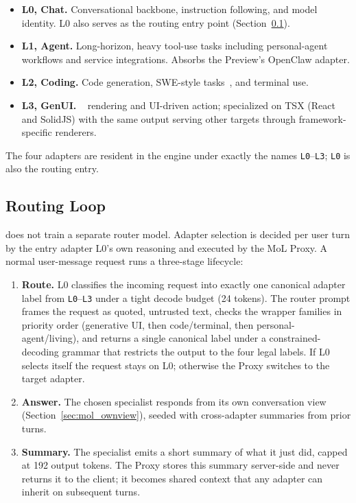 \begin{itemize}[leftmargin=*]
  \item \textbf{L0, Chat.} Conversational backbone, instruction following, and model identity. L0 also serves as the routing entry point (Section~\ref{sec:mol_router}).
  \item \textbf{L1, Agent.} Long-horizon, heavy tool-use tasks including personal-agent workflows and service integrations. Absorbs the Preview's OpenClaw adapter.
  \item \textbf{L2, Coding.} Code generation, SWE-style tasks~\citep{jimenez2024swebench}, and terminal use.
  \item \textbf{L3, GenUI.} \uifora{}~\citep{ui4a2026} rendering and UI-driven action; specialized on TSX (React and SolidJS) with the same output serving other targets through framework-specific renderers.
\end{itemize}
The four adapters are resident in the engine under exactly the names \texttt{L0}--\texttt{L3}; \texttt{L0} is also the routing entry.

\subsection{Routing Loop}
\label{sec:mol_router}

\molshort{} does not train a separate router model. Adapter selection is decided per user turn by the entry adapter L0's own reasoning and executed by the MoL Proxy. A normal user-message request runs a three-stage lifecycle:

\begin{enumerate}[leftmargin=*]
  \item \textbf{Route.} L0 classifies the incoming request into exactly one canonical adapter label from \texttt{L0}--\texttt{L3} under a tight decode budget (24 tokens). The router prompt frames the request as quoted, untrusted text, checks the wrapper families in priority order (generative UI, then code/terminal, then personal-agent/living), and returns a single canonical label under a constrained-decoding grammar that restricts the output to the four legal labels. If L0 selects itself the request stays on L0; otherwise the Proxy switches to the target adapter.
  \item \textbf{Answer.} The chosen specialist responds from its own conversation view (Section~\ref{sec:mol_ownview}), seeded with cross-adapter summaries from prior turns.
  \item \textbf{Summary.} The specialist emits a short summary of what it just did, capped at 192 output tokens. The Proxy stores this summary server-side and never returns it to the client; it becomes shared context that any adapter can inherit on subsequent turns.
\end{enumerate}

